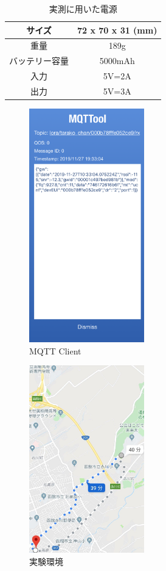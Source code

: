 \begin{table}[]
    \caption{実測に用いた電源}\label{fig:LoRaWAN_Battery}
    \centering
    \begin{tabular}{|c|c|}
    \hline
    サイズ     & 72 x 70 x 31 (mm) \\ \hline
    重量      & 189g              \\ \hline
    バッテリー容量 & 5000mAh           \\ \hline
    入力      & 5V=2A             \\ \hline
    出力      & 5V=3A             \\ \hline
    \end{tabular}
\end{table}

\begin{figure}[]
    \begin{center}
    \includegraphics[width=5cm]{figures/mqtt.PNG}
    \caption{MQTT Client}
    \label{fig:mqtt}
    \end{center}
\end{figure}

\begin{figure}[]
    \begin{center}
    \includegraphics[width=5cm]{figures/v2.0/google_map.jpg}
    \caption{実験環境}
    \label{fig:google_map}
    \end{center}
\end{figure}

